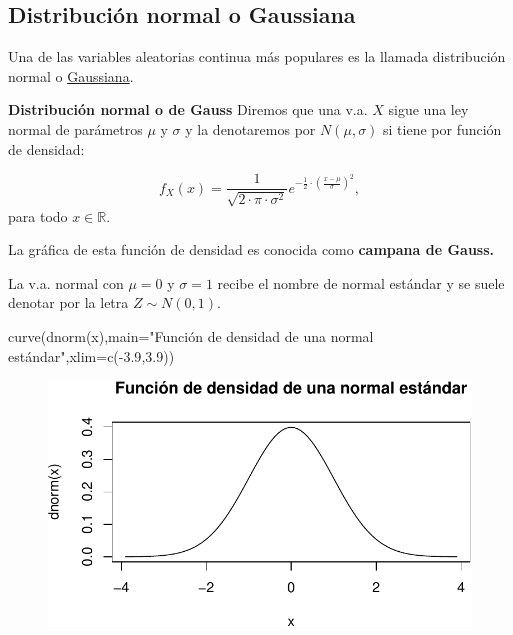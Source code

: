\documentclass[
  letterpaper,
  DIV=11,
  numbers=noendperiod]{scrreprt}
\newenvironment{Shaded}{\begin{snugshade}}{\end{snugshade}}
\newcommand{\AttributeTok}[1]{\textcolor[rgb]{0.40,0.45,0.13}{#1}}
\newcommand{\FloatTok}[1]{\textcolor[rgb]{0.68,0.00,0.00}{#1}}
\newcommand{\FunctionTok}[1]{\textcolor[rgb]{0.28,0.35,0.67}{#1}}
\newcommand{\NormalTok}[1]{\textcolor[rgb]{0.00,0.23,0.31}{#1}}
\newcommand{\SpecialCharTok}[1]{\textcolor[rgb]{0.37,0.37,0.37}{#1}}
\newcommand{\StringTok}[1]{\textcolor[rgb]{0.13,0.47,0.30}{#1}}
\begin{document}
\hypertarget{distribuciuxf3n-normal-o-gaussiana}{%
\subsection{Distribución normal o
Gaussiana}\label{distribuciuxf3n-normal-o-gaussiana}}

Una de las variables aleatorias continua más populares es la llamada
distribución normal o
\href{https://es.wikipedia.org/wiki/Distribuci\%C3\%B3n_normal}{Gaussiana}.

\textbf{Distribución normal o de Gauss} Diremos que una v.a. \(X\) sigue
una ley normal de parámetros \(\mu\) y \(\sigma\) y la denotaremos por
\(N(\mu,\sigma)\) si tiene por función de densidad:

\[
f_{X}(x)=\frac1{\sqrt{2\cdot\pi\cdot\sigma^2}}
e^{-\frac{1}{2}\cdot\left(\frac{x-\mu}{\sigma}\right)^2},
\] para todo \(x\in \mathbb{R}.\)

La gráfica de esta función de densidad es conocida como \textbf{campana
de Gauss.}

La v.a. normal con \(\mu=0\) y \(\sigma=1\) recibe el nombre de normal
estándar y se suele denotar por la letra \(Z\sim N(0,1)\).

\begin{Shaded}
\begin{Highlighting}[]
\FunctionTok{curve}\NormalTok{(}\FunctionTok{dnorm}\NormalTok{(x),}\AttributeTok{main=}\StringTok{"Función de densidad de una normal estándar"}\NormalTok{,}\AttributeTok{xlim=}\FunctionTok{c}\NormalTok{(}\SpecialCharTok{{-}}\FloatTok{3.9}\NormalTok{,}\FloatTok{3.9}\NormalTok{))}
\end{Highlighting}
\end{Shaded}

\begin{figure}[H]

{\centering \includegraphics{3_files/figure-pdf/normaldensidad1-1.pdf}

}

\end{figure}
\end{document}

